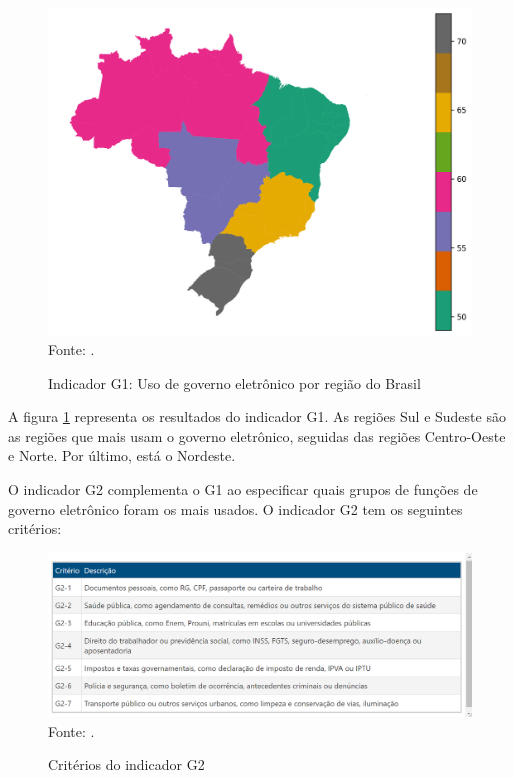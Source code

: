 \begin{figure}[H]
	\centering
	\caption{Indicador G1: Uso de governo eletrônico por região do Brasil}
	\includegraphics[width=1\linewidth]{figuras/mapa_coropletico_tic_domicilios_2024_g1}
	\label{fig:mapa_coropletico_tic_domicilio_g1}
	\footnotesize{Fonte: \cite{tic_domicilios_2024_g1}.}
\end{figure}

A figura \ref{fig:mapa_coropletico_tic_domicilio_g1} representa os resultados do indicador G1. As regiões Sul e Sudeste são as regiões que mais usam o governo eletrônico, seguidas das regiões Centro-Oeste e Norte. Por último, está o Nordeste.

O indicador G2 complementa o G1 ao especificar quais grupos de funções de governo eletrônico foram os mais usados. O indicador G2 tem os seguintes critérios:

\begin{figure}[H]
	\centering
	\caption{Critérios do indicador G2}
	\includegraphics[width=1\linewidth]{figuras/tabela_tic_domicilios_2024_criterios_g2.png}
	\label{fig:tabela_tic_domicilios_2024_criterios_g2}
	\footnotesize{Fonte: \cite{tic_domicilios_2024_g2}.}
\end{figure}

